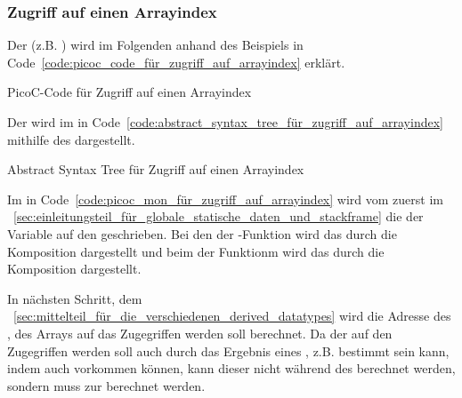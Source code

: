 \subsubsection{Zugriff auf einen Arrayindex}
\label{sec:zugriff_auf_ein_arrayelement}

Der  (z.B. ) wird im Folgenden anhand des Beispiels in Code~\ref{code:picoc_code_für_zugriff_auf_arrayindex} erklärt.

\begin{code}
  \centering
  \caption{PicoC-Code für Zugriff auf einen Arrayindex}
  \label{code:picoc_code_für_zugriff_auf_arrayindex}
\end{code}

Der   wird im   in Code~\ref{code:abstract_syntax_tree_für_zugriff_auf_arrayindex} mithilfe des   dargestellt.

\begin{code}
  \centering
  \caption{Abstract Syntax Tree für Zugriff auf einen Arrayindex}
  \label{code:abstract_syntax_tree_für_zugriff_auf_arrayindex}
\end{code}

Im  in Code~\ref{code:picoc_mon_für_zugriff_auf_arrayindex} wird vom   zuerst im ~\ref{sec:einleitungsteil_für_globale_statische_daten_und_stackframe} die  der Variable  auf den  geschrieben. Bei den  der -Funktion wird das durch die Komposition  dargestellt und beim  der Funktionm  wird das durch die Komposition  dargestellt.

In nächsten Schritt, dem ~\ref{sec:mittelteil_für_die_verschiedenen_derived_datatypes} wird die Adresse des , des Arrays auf das Zugegriffen werden soll berechnet. Da der  auf den Zugegriffen werden soll auch durch das Ergebnis eines , z.B.  bestimmt sein kann, indem auch  vorkommen können, kann dieser nicht während des  berechnet werden, sondern muss zur  berechnet werden.


